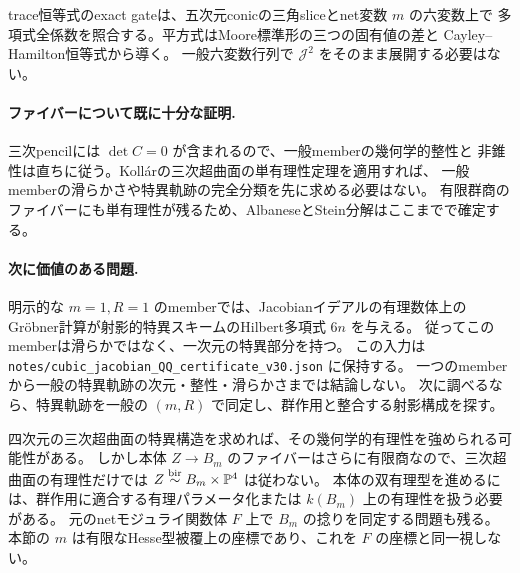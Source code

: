 trace恒等式のexact gateは、五次元conicの三角sliceとnet変数 $m$ の六変数上で
多項式全係数を照合する。平方式はMoore標準形の三つの固有値の差と
Cayley--Hamilton恒等式から導く。
一般六変数行列で $\mathscr J^2$ をそのまま展開する必要はない。

\paragraph{ファイバーについて既に十分な証明.}
三次pencilには $\det C=0$ が含まれるので、一般memberの幾何学的整性と
非錐性は直ちに従う。Koll\'arの三次超曲面の単有理性定理を適用すれば、
一般memberの滑らかさや特異軌跡の完全分類を先に求める必要はない。
有限群商のファイバーにも単有理性が残るため、AlbaneseとStein分解はここまでで確定する。

\paragraph{次に価値のある問題.}
明示的な $m=1,R=1$ のmemberでは、Jacobianイデアルの有理数体上の
Gr\"obner計算が射影的特異スキームのHilbert多項式 $6n$ を与える。
従ってこのmemberは滑らかではなく、一次元の特異部分を持つ。
この入力は \nolinkurl{notes/cubic_jacobian_QQ_certificate_v30.json} に保持する。
一つのmemberから一般の特異軌跡の次元・整性・滑らかさまでは結論しない。
次に調べるなら、特異軌跡を一般の $(m,R)$ で同定し、群作用と整合する射影構成を探す。

四次元の三次超曲面の特異構造を求めれば、その幾何学的有理性を強められる可能性がある。
しかし本体 $Z\to B_m$ のファイバーはさらに有限商なので、三次超曲面の有理性だけでは
$Z\mathrel{\overset{\mathrm{bir}}{\sim}} B_m\times\mathbb P^4$ は従わない。
本体の双有理型を進めるには、群作用に適合する有理パラメータ化または
$k(B_m)$ 上の有理性を扱う必要がある。
元のnetモジュライ関数体 $F$ 上で $B_m$ の捻りを同定する問題も残る。
本節の $m$ は有限なHesse型被覆上の座標であり、これを $F$ の座標と同一視しない。
